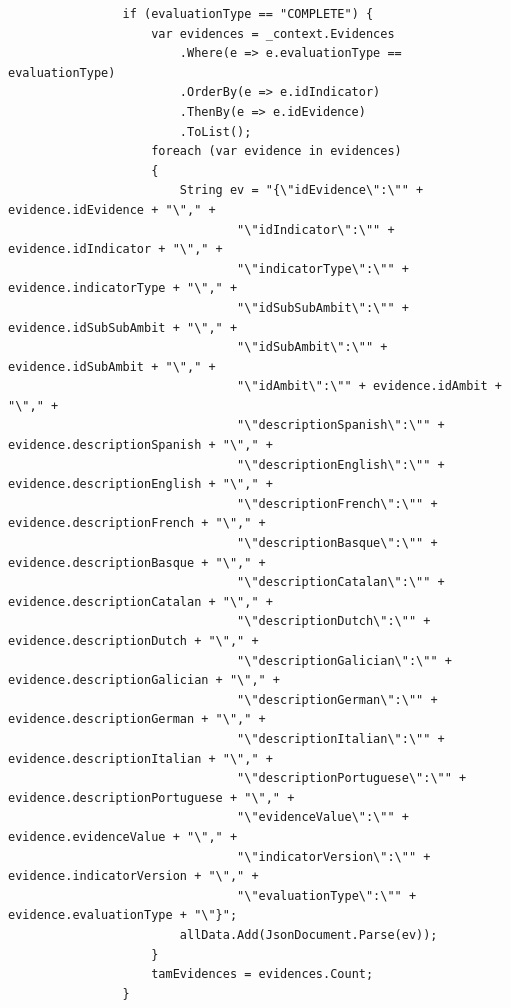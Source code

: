 \begin{itemize}
\begin{itemize}
\begin{lstlisting}
                if (evaluationType == "COMPLETE") {
                    var evidences = _context.Evidences
                        .Where(e => e.evaluationType == evaluationType)
                        .OrderBy(e => e.idIndicator)
                        .ThenBy(e => e.idEvidence)
                        .ToList();
                    foreach (var evidence in evidences)
                    {
                        String ev = "{\"idEvidence\":\"" + evidence.idEvidence + "\"," +
                                "\"idIndicator\":\"" + evidence.idIndicator + "\"," +
                                "\"indicatorType\":\"" + evidence.indicatorType + "\"," +
                                "\"idSubSubAmbit\":\"" + evidence.idSubSubAmbit + "\"," +
                                "\"idSubAmbit\":\"" + evidence.idSubAmbit + "\"," +
                                "\"idAmbit\":\"" + evidence.idAmbit + "\"," +
                                "\"descriptionSpanish\":\"" + evidence.descriptionSpanish + "\"," +
                                "\"descriptionEnglish\":\"" + evidence.descriptionEnglish + "\"," +
                                "\"descriptionFrench\":\"" + evidence.descriptionFrench + "\"," +
                                "\"descriptionBasque\":\"" + evidence.descriptionBasque + "\"," +
                                "\"descriptionCatalan\":\"" + evidence.descriptionCatalan + "\"," +
                                "\"descriptionDutch\":\"" + evidence.descriptionDutch + "\"," +
                                "\"descriptionGalician\":\"" + evidence.descriptionGalician + "\"," +
                                "\"descriptionGerman\":\"" + evidence.descriptionGerman + "\"," +
                                "\"descriptionItalian\":\"" + evidence.descriptionItalian + "\"," +
                                "\"descriptionPortuguese\":\"" + evidence.descriptionPortuguese + "\"," +
                                "\"evidenceValue\":\"" + evidence.evidenceValue + "\"," +
                                "\"indicatorVersion\":\"" + evidence.indicatorVersion + "\"," +
                                "\"evaluationType\":\"" + evidence.evaluationType + "\"}";
                        allData.Add(JsonDocument.Parse(ev));
                    }
                    tamEvidences = evidences.Count;
                }
                


\end{lstlisting}
\end{itemize}
\end{itemize}
